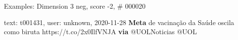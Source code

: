 \begin{frame}{Examples: Dimension 3 neg, score -2, \# 000020}
\footnotesize
\begin{alertblock}{text: t001431, user: unknown, 2020-11-28}
\textbf{Meta} de vacinação da Saúde oscila como biruta https://t.co/2x0IlfVNJA 
\textbf{via} @UOLNoticias @UOL 
\end{alertblock}
\end{frame}

